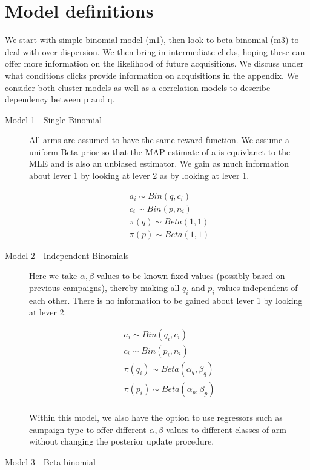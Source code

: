 \documentclass[11pt,a4,singlespacing,titlepagenumber=on]{scrreprt}
\numberwithin{equation}{chapter} %
\theoremstyle{remark}
\begin{document}
\section{Model definitions} 


We start with simple binomial model (m1), then look to beta binomial (m3) to deal with over-dispersion. We then bring in intermediate clicks, hoping these can offer more information on the likelihood of future acquisitions. We discuss under what conditions clicks provide information on acquisitions in the appendix. We consider both cluster models as well as a correlation models to describe dependency between p and q.

\begin{description}
	\item[Model 1 - Single Binomial]
All arms are assumed to have the same reward function. We assume a uniform Beta prior so that the MAP estimate of a is equivlanet to the MLE and is also an unbiased estimator. We gain as much information about lever 1 by looking at lever 2 as by looking at lever 1.

  \begin{align}
	a_i \sim Bin(q,c_i) \\
	c_i \sim Bin(p,n_i) \\
	\pi(q) \sim Beta(1,1) \\
	\pi(p) \sim Beta(1,1) 
  \end{align}

	\item[Model 2 - Independent Binomials]
Here we take $\alpha, \beta$ values to be known fixed values (possibly based on previous campaigns), thereby making all $q_i$ and $p_i$ values independent of each other. There is no information to be gained about lever 1 by looking at lever 2.

  \begin{align}
	a_i \sim Bin(q_i,c_i) \\
	c_i \sim Bin(p_i,n_i) \\
	\pi(q_i) \sim Beta(\alpha_q,\beta_q) \\
	\pi(p_i) \sim Beta(\alpha_p,\beta_p) \\
  \end{align}

Within this model, we also have the option to use regressors such as campaign type to offer different $\alpha, \beta$ values to different classes of arm without changing the posterior update procedure.

	\item[Model 3 - Beta-binomial]



\end{description}
\end{document}
